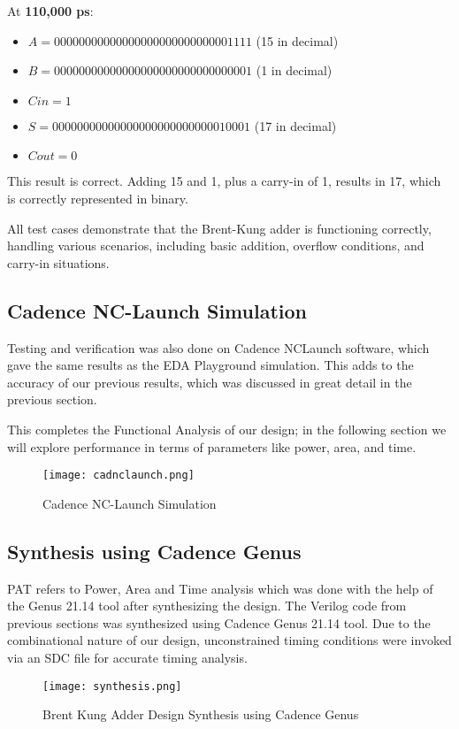\documentclass{IEEEtran}
\begin{document}
\vspace{0.5em}
\noindent At \textbf{110,000 ps}:  
\begin{itemize}
    \item \( A = 00000000000000000000000000001111 \) (15 in decimal)
    \item \( B = 00000000000000000000000000000001 \) (1 in decimal)
    \item \( Cin = 1 \)
    \item \( S = 00000000000000000000000000010001 \) (17 in decimal)
    \item \( Cout = 0 \)
\end{itemize}
This result is correct. Adding 15 and 1, plus a carry-in of 1, results in 17, which is correctly represented in binary.

\vspace{0.5em}
\noindent All test cases demonstrate that the Brent-Kung adder is functioning correctly, handling various scenarios, including basic addition, overflow conditions, and carry-in situations.


\subsection{Cadence NC-Launch Simulation}
Testing and verification was also done on Cadence NCLaunch software, which gave the same results as the EDA Playground simulation. This adds to the accuracy of our previous results, which was discussed in great detail in the previous section.

This completes the Functional Analysis of our design; in the following section we will explore performance in terms of parameters like power, area, and time.

\begin{figure}[H]
    \centering
    \texttt{[image: cadnclaunch.png]}
    \caption{Cadence NC-Launch Simulation}
    \label{fig:enter-label}
\end{figure}

\subsection{Synthesis using Cadence Genus}
PAT refers to Power, Area and Time analysis which was done with the help of the Genus 21.14 tool after synthesizing the design. The Verilog code from previous sections was synthesized using Cadence Genus 21.14 tool. Due to the combinational nature of our design, unconstrained timing conditions were invoked via an SDC file for accurate timing analysis.
\begin{figure}[H]
    \centering
    \texttt{[image: synthesis.png]}
    \caption{Brent Kung Adder Design Synthesis using Cadence Genus}
    \label{fig:enter-label}
\end{figure}
\end{document}
